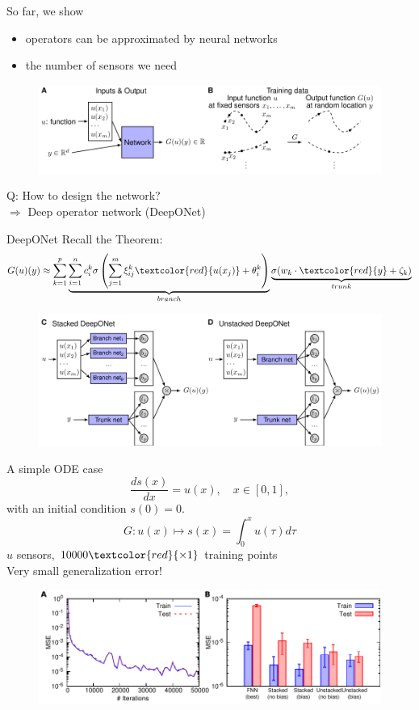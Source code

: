 \documentclass{beamer}
\begin{document}
\begin{frame}
So far, we show
\begin{itemize}
\item operators can be approximated by neural networks
\item the number of sensors we need
\end{itemize}
\begin{figure}
\centering
\includegraphics[width=.9\textwidth]{setup.pdf}
\end{figure} \pause
Q: How to design the network? \\
$\Rightarrow$ Deep operator network (DeepONet)
\end{frame}

\begin{frame}{DeepONet}
Recall the Theorem:
\begin{equation*}
G(u)(y) \approx \sum_{k=1}^p
\underbrace{\sum_{i=1}^n c_i^k \sigma\left(\sum_{j=1}^m \xi_{ij}^k \textcolor{red}{u(x_j)}+\theta_i^k\right)}_{branch}
\underbrace{\sigma(w_k \cdot \textcolor{red}{y}+\zeta_k)}_{trunk}
\end{equation*}
\begin{figure}
\centering
\includegraphics[width=.9\textwidth]{deeponet.pdf}
\end{figure}
\end{frame}

\begin{frame}{A simple ODE case}
$$\frac{ds(x)}{dx} = u(x), \quad x \in [0, 1],$$
with an initial condition $s(0)=0$.
$$G: u(x) \mapsto s(x) = \int_0^x u(\tau) d\tau$$  $u$ sensors, $10000 \textcolor{red}{\times 1}$ training points \\ \pause
Very small generalization error!
\begin{figure}
\centering
\includegraphics[width=.9\textwidth]{coefnet.pdf}
\end{figure}
\end{frame}
\end{document}
